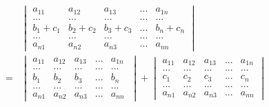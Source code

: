 \documentclass[blue,normal,cn]{elegantnote}
\begin{document}
\begin{property}
    \begin{equation*}
        \begin{aligned}
            &
            \begin{vmatrix} 
                a_{11}&a_{12} & a_{13} &...& a_{1n}\\
                ...&...&...&...&...\\
                b_1+c_1&b_2+c_2 & b_3+c_3 &...& b_n+c_n\\
                ...&...&...&...&...\\
                a_{n1}&a_{n2} & a_{n3} &...& a_{nn}
            \end{vmatrix}
        \\=&
        \begin{vmatrix} 
            a_{11}&a_{12} & a_{13} &...& a_{1n}\\
            ...&...&...&...&...\\
            b_1&b_2 & b_3 &...& b_n\\
            ...&...&...&...&...\\
            a_{n1}&a_{n2} & a_{n3} &...& a_{nn}\
            \end{vmatrix}
            +
            \begin{vmatrix} 
                a_{11}&a_{12} & a_{13} &...& a_{1n}\\
                ...&...&...&...&...\\
                c_1&c_2 & c_3 &...& c_n\\
                ...&...&...&...&...\\
                a_{n1}&a_{n2} & a_{n3} &...& a_{nn}
            \end{vmatrix}
        \end{aligned}
    \end{equation*}
    \end{property}
\end{document}
